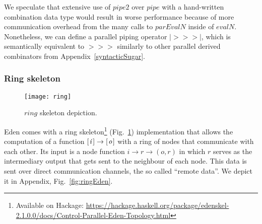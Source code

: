 \documentclass{jfp1}
\newcommand{\Varid}[1]{\mathit{#1}}
\begin{document}
We speculate that extensive use of \ensuremath{\Varid{pipe2}} over \ensuremath{\Varid{pipe}} with a hand-written combination data type would result in worse performance because of more communication overhead from the many calls to \ensuremath{\Varid{parEvalN}} inside of \ensuremath{\Varid{evalN}}. Nonetheless, we can define a parallel piping operator \ensuremath{\mathbin{|\!>\!\!>\!\!>\!|}}, which is semantically equivalent to \ensuremath{\mathbin{>\!\!>\!\!>}} similarly to other parallel derived combinators from Appendix~\ref{syntacticSugar}.



\subsubsection{Ring skeleton} \label{sec:ring}
\begin{figure}[tb]
	\texttt{[image: ring]}
	\caption{\ensuremath{\Varid{ring}} skeleton depiction.}
	\label{fig:ringImg}
\end{figure}
Eden comes with a ring skeleton\footnote{Available on Hackage: \url{https://hackage.haskell.org/package/edenskel-2.1.0.0/docs/Control-Parallel-Eden-Topology.html}} (Fig.~\ref{fig:ringImg}) implementation that allows the computation of a function \ensuremath{[\mskip1.5mu \Varid{i}\mskip1.5mu]\to [\mskip1.5mu \Varid{o}\mskip1.5mu]} with a ring of nodes that communicate with each other. Its input is a node function \ensuremath{\Varid{i}\to \Varid{r}\to (\Varid{o},\Varid{r})} in which \ensuremath{\Varid{r}} serves as the intermediary output that gets sent to the neighbour of each node. This data is sent over direct communication channels, the so called \enquote{remote data}. We depict it in Appendix, Fig.~\ref{fig:ringEden}.
\end{document}
